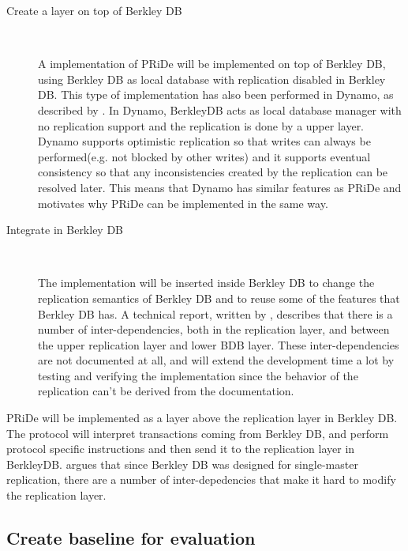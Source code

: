 \begin{description}
 
\item[Create a layer on top of Berkley DB] \
	
A implementation of PRiDe will be implemented on top of Berkley DB, using Berkley DB as local database with replication disabled in Berkley DB. This type of implementation has also been performed in Dynamo, as described by \cite{Dynamo2007}. In Dynamo, BerkleyDB acts as local database manager with no replication support and the replication is done by a upper layer. Dynamo supports optimistic replication so that writes can always be performed(e.g. not blocked by other writes) and it supports eventual consistency so that any inconsistencies created by the replication can be resolved later. This means that Dynamo has similar features as PRiDe and motivates why PRiDe can be implemented in the same way.  
	
\item[Integrate in Berkley DB] \

The implementation will be inserted inside Berkley DB to change the replication semantics of Berkley DB and to reuse some of the features that Berkley DB has. A technical report, written by \cite{kang2008}, describes that there is a number of inter-dependencies, both in the replication layer, and between the upper replication layer and lower BDB layer. These inter-dependencies are not documented at all, and will extend the development time a lot by testing and verifying the implementation since the behavior of the replication can't be derived from the documentation.
 
\end{description}
   	
PRiDe will be implemented as a layer above the replication layer in Berkley DB. The protocol will interpret transactions coming from  Berkley DB, and perform protocol specific instructions and then send it to the replication layer in BerkleyDB. \cite{kang2008} argues that since Berkley DB was designed for single-master replication, there are a number of inter-depedencies that make it hard to modify the replication layer.

\subsection{Create baseline for evaluation} %
\label{sub:extend_framework}

